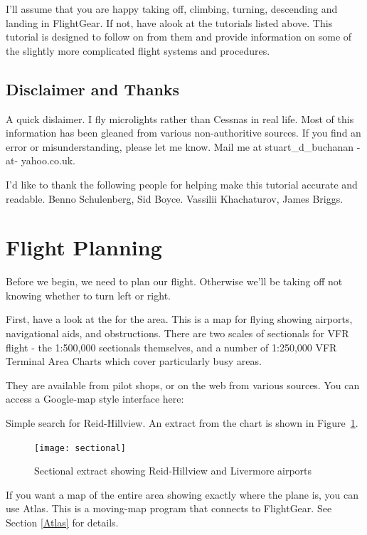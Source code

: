 I'll assume that you are happy taking off, climbing, turning, descending 
and landing in FlightGear. If not, have alook at the tutorials listed above. 
This tutorial is designed to follow on from them and provide information on 
some of the slightly more complicated flight systems and procedures.

\subsection{Disclaimer and Thanks}

A quick dislaimer. I fly microlights rather than Cessnas in real life. Most of 
this information has been gleaned from various non-authoritive sources. If you 
find an error or misunderstanding, please let me know. Mail me at 
stuart\_d\_buchanan -at- yahoo.co.uk.

I'd like to thank the following people for helping make this tutorial accurate 
and readable. Benno Schulenberg, Sid Boyce. Vassilii Khachaturov, James Briggs.

\section{Flight Planning}

Before we begin, we need to plan our flight. 
Otherwise we'll be taking off not knowing whether to turn left or right.

First, have a look at the  for the area. This is a map for 
flying showing airports, navigational aids, and obstructions. 
There are two scales of sectionals for VFR flight - 
the 1:500,000 sectionals themselves, and a number of 
1:250,000 VFR Terminal Area Charts which cover particularly busy areas.

They are available from pilot shops, or on the web from various sources. 
You can access a Google-map style interface here:

\medskip
{}
\medskip

Simple search for Reid-Hillview. An extract from the chart is shown in Figure~\ref{sectional}.

\begin{figure}[!htp]
\centering
\texttt{[image: sectional]}
\caption{Sectional extract showing Reid-Hillview and Livermore airports\label{sectional}}
\end{figure}

If you want a map of the entire area showing exactly where the plane is, 
you can use Atlas. 
This is a moving-map program that connects to FlightGear. See Section \ref{Atlas} for details.

